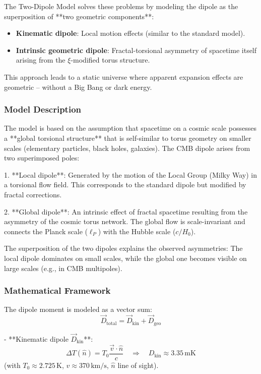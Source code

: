 The Two-Dipole Model solves these problems by modeling the dipole as the superposition of **two geometric components**:
\begin{itemize}
	\item \textbf{Kinematic dipole}: Local motion effects (similar to the standard model).
	\item \textbf{Intrinsic geometric dipole}: Fractal-torsional asymmetry of spacetime itself arising from the $\xi$-modified torus structure.
\end{itemize}

This approach leads to a static universe where apparent expansion effects are geometric – without a Big Bang or dark energy.

\subsubsection{Model Description}

The model is based on the assumption that spacetime on a cosmic scale possesses a **global torsional structure** that is self-similar to torus geometry on smaller scales (elementary particles, black holes, galaxies). The CMB dipole arises from two superimposed poles:

1. **Local dipole**: Generated by the motion of the Local Group (Milky Way) in a torsional flow field. This corresponds to the standard dipole but modified by fractal corrections.

2. **Global dipole**: An intrinsic effect of fractal spacetime resulting from the asymmetry of the cosmic torus network. The global flow is scale-invariant and connects the Planck scale ($\ell_P$) with the Hubble scale ($c/H_0$).

The superposition of the two dipoles explains the observed asymmetries: The local dipole dominates on small scales, while the global one becomes visible on large scales (e.g., in CMB multipoles).

\subsubsection{Mathematical Framework}

The dipole moment is modeled as a vector sum:
\begin{equation}
	\vec{D}_{\text{total}} = \vec{D}_{\text{kin}} + \vec{D}_{\text{geo}}
	\label{eq:two_dipole}
\end{equation}

- **Kinematic dipole $\vec{D}_{\text{kin}}$**:
\[
\Delta T(\hat{n}) = T_0 \frac{\vec{v} \cdot \hat{n}}{c} \quad \Rightarrow \quad D_{\text{kin}} \approx 3.35\,\text{mK}
\]
(with $T_0 \approx 2.725\,\text{K}$, $v \approx 370\,\text{km/s}$, $\hat{n}$ line of sight).

